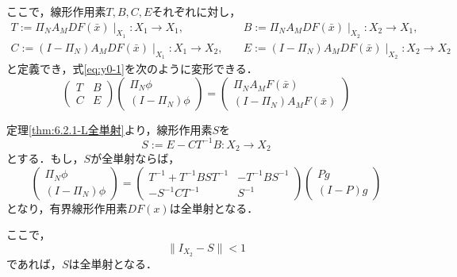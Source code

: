 ここで，線形作用素$T,B,C,E$それぞれに対し，
\begin{equation*}
    \label{eq:def_lo}
    \begin{split}
    T:= \Pi_N A_M DF(\bar{x}) \mid _{X_1}:X_1 \rightarrow X_1,\quad &
    B:= \Pi_N A_M DF(\bar{x}) \mid _{X_2}:X_2 \rightarrow X_1, \\
    C:= (I-\Pi_N) A_M DF(\bar{x}) \mid _{X_1}:X_1 \rightarrow X_2,\quad &
    E:= (I-\Pi_N) A_M DF(\bar{x}) \mid _{X_2}:X_2 \rightarrow X_2
  \end{split}
\end{equation*}
と定義でき，式\eqref{eq:y0-1}を次のように変形できる．
\begin{equation}
  \begin{pmatrix}
    T & B \\
    C & E
  \end{pmatrix}
  \begin{pmatrix}
    \Pi_N \phi \\
    (I -\Pi_N) \phi
  \end{pmatrix}
  =
  \begin{pmatrix}
    \Pi_N A_M F(\bar{x}) \\
    (I - \Pi_N) A_M F(\bar{x})
  \end{pmatrix}
\end{equation}

定理\ref{thm:6.2.1-L全単射}より，線形作用素$S$を
\begin{equation*}
  S:=E-CT^{-1}B:X_2 \rightarrow X_2
\end{equation*}
とする．もし，$S$が全単射ならば，
\begin{equation*}
  \begin{pmatrix}
    \Pi_N \phi \\
    (I-\Pi_N)\phi
  \end{pmatrix}
  =
  \begin{pmatrix}
    T^{-1}+T^{-1}BST^{-1} & -T^{-1}BS^{-1} \\
    -S^{-1}CT^{-1} & S^{-1}
  \end{pmatrix}
  \begin{pmatrix}
    Pg \\
    (I-P)g
  \end{pmatrix}
\end{equation*}
となり，有界線形作用素$DF(x)$は全単射となる．

ここで，
\begin{equation}
  \label{eq:I-S_1}
  \| I_{X_2} -S \| < 1
\end{equation}
であれば，$S$は全単射となる．

